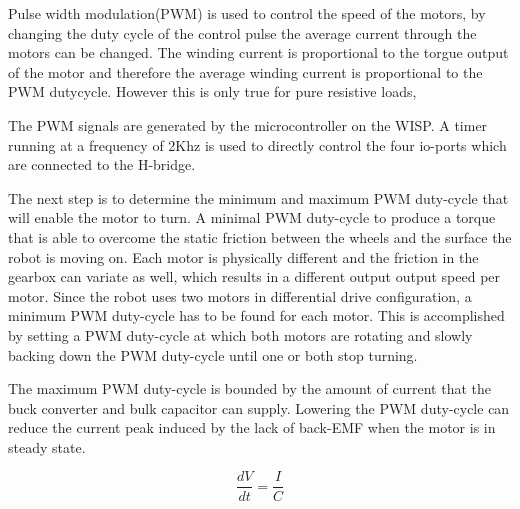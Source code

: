 
Pulse width modulation(PWM) is used to control the speed of the motors, by changing the duty cycle of the control pulse the average current through the motors can be changed.
The winding current is proportional to the torgue output of the motor and therefore the average winding current is proportional to the PWM dutycycle.
However this is only true for pure resistive loads,


The PWM signals are generated by the microcontroller on the WISP.
A timer running at a frequency of 2Khz is used to directly control the four io-ports which are connected to the H-bridge.


The next step is to determine the minimum and maximum PWM duty-cycle that will enable the motor to turn.
A minimal PWM duty-cycle to produce a torque that is able to overcome the static friction between the wheels and the surface the robot is moving on.
Each motor is physically different and the friction in the gearbox can variate as well, which results in a different output output speed per motor.
Since the robot uses two motors in differential drive configuration, a minimum PWM duty-cycle has to be found for each motor.
This is accomplished by setting a PWM duty-cycle at which both motors are rotating and slowly backing down the PWM duty-cycle until one or both stop turning.

The maximum PWM duty-cycle is bounded by the amount of current that the buck converter and bulk capacitor can supply.
Lowering the PWM duty-cycle can reduce the current peak induced by the lack of back-EMF when the motor is in steady state.


\begin{equation}
\frac{dV}{dt} = \frac{I}{C}
\end{equation}

